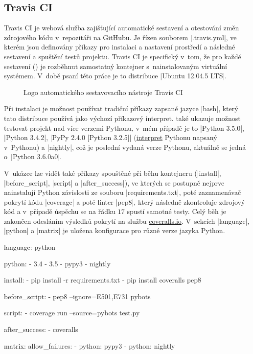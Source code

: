 \subsection{Travis CI}
\label{subsec:travis-ci}

Travis CI je webová služba zajišťující automatické sestavení a otestování změn zdrojového kódu v~repozitáři na GitHubu. Je řízen souborem \ic|.travis.yml|\cite{travis-docs}, ve kterém jsou definovány příkazy pro instalaci a nastavení prostředí a následné sestavení a spuštění testů projektu. Travis CI je specifický v~tom, že pro každé sestavení () je rozběhnut samostatný kontejner s~nainstalovaným virtuální systémem. V~době psaní této práce je to distribuce \ic|Ubuntu 12.04.5 LTS|. 

\begin{figure}
	\centering
	
	\caption{Logo automatického sestavovacího nástroje Travis CI}
\end{figure}

Při instalaci je možnost používat tradiční příkazy zapsané jazyce \ic|bash|, který tato distribuce používá jako výchozí příkazový interpret.  také ukazuje možnost testovat projekt nad více verzemi Pythonu, v~mém případě je to \ic|Python 3.5.0|, \ic|Python 3.4.2|, \ic|PyPy 2.4.0 [Python 3.2.5]| (\href{http://pypy.org/}{interpret} Pythonu napsaný v~Pythonu) a \ic|nightly|, což je poslední vydaná verze Pythonu, aktuálně se jedná o~\ic|Python 3.6.0a0|.

V~ukázce lze vidět také příkazy spouštěné při běhu kontejneru (\ic|install|, \ic|before_script|, \ic|script| a \ic|after_success|), ve kterých se postupně nejprve nainstalují Python závislosti ze souboru \ic|requirements.txt|, poté zaznamenávač pokrytí kódu \ic|coverage| a poté linter \ic|pep8|, který následně zkontroluje zdrojový kód a v~případě úspěchu se na řádku $17$ spustí samotné testy. Celý běh je zakončen odesláním výsledků pokrytí na službu \href{https://coveralls.io/}{coveralls.io}. V~sekcích \ic|language|, \ic|python| a \ic|matrix| je uložena konfigurace pro různé verze jazyka Python.


\begin{code}[caption={Zkrácená ukázka konfiguračního soubotu .travis.yml},label={lst:travis-yml},keywords={}]
language: python

python:
  - 3.4
  - 3.5
  - pypy3
  - nightly

install:
  - pip install -r requirements.txt
  - pip install coveralls pep8

before_script:
  - pep8 --ignore=E501,E731 pybots

script:
  - coverage run --source=pybots test.py

after_success:
  - coveralls

matrix:
  allow_failures:
    - python: pypy3
    - python: nightly
\end{code}

